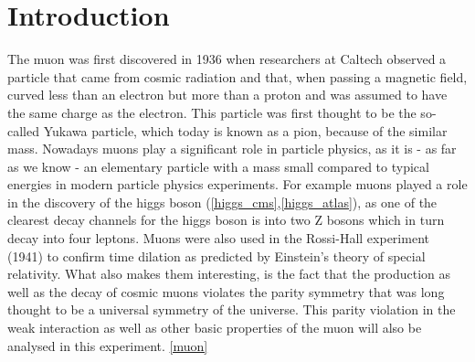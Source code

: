 \section{Introduction}
The muon was first discovered in 1936 when researchers at Caltech observed a particle that came from cosmic radiation and that, when passing a magnetic field, curved less than an electron but more than a proton and was assumed to have the same charge as the electron. This particle was first thought to be the so-called Yukawa particle, which today is known as a pion, because of the similar mass. Nowadays muons play a significant role in particle physics, as it is - as far as we know - an elementary particle with a mass small compared to typical energies in modern particle physics experiments. For example muons played a role in the discovery of the higgs boson (\ref{higgs_cms},\ref{higgs_atlas}), as one of the clearest decay channels for the higgs boson is into two Z bosons which in turn decay into four leptons. Muons were also used in the Rossi-Hall experiment (1941) to confirm time dilation as predicted by Einstein's theory of special relativity. 
What also makes them interesting, is the fact that the production as well as the decay of cosmic muons violates the parity symmetry that was long thought to be a universal symmetry of the universe. This parity violation in the weak interaction as well as other basic properties of the muon will also be analysed in this experiment. \ref{muon}